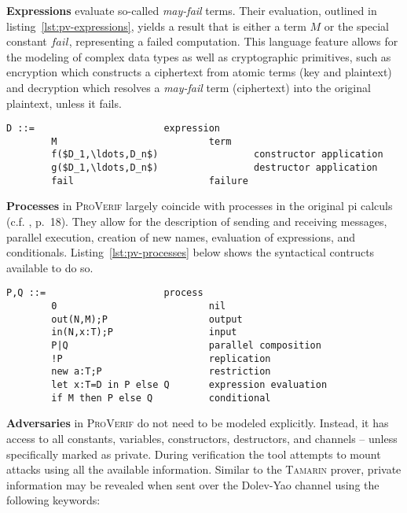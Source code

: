 \textbf{Expressions} evaluate so-called \textit{may-fail} terms.
Their evaluation, outlined in listing~\ref{lst:pv-expressions}, yields a result that is either a term $M$ or the special constant $fail$, representing a failed computation.
This language feature allows for the modeling of complex data types as well as cryptographic primitives, such as encryption which constructs a ciphertext from atomic terms (key and plaintext) and decryption which resolves a \textit{may-fail} term (ciphertext) into the original plaintext, unless it fails.

\begin{lstlisting}[caption={ProVerif expression grammar, according to \cite{blanchet2016modeling}, p.~13},label={lst:pv-expressions}]
    D ::=                       expression
        M                           term
        f($D_1,\ldots,D_n$)                 constructor application
        g($D_1,\ldots,D_n$)                 destructor application
        fail                        failure
\end{lstlisting}

\textbf{Processes} in \textsc{ProVerif} largely coincide with processes in the original pi calculs (c.f. \cite{blanchet2016modeling}, p.~18).
They allow for the description of sending and receiving messages, parallel execution, creation of new names, evaluation of expressions, and conditionals.
Listing~\ref{lst:pv-processes} below shows the syntactical contructs available to do so.

\begin{lstlisting}[caption={ProVerif process grammar, according to \cite{blanchet2016modeling}, p.~13},label={lst:pv-processes}]
    P,Q ::=                     process
        0                           nil
        out(N,M);P                  output
        in(N,x:T);P                 input
        P|Q                         parallel composition
        !P                          replication
        new a:T;P                   restriction
        let x:T=D in P else Q       expression evaluation
        if M then P else Q          conditional
\end{lstlisting}

\textbf{Adversaries} in \textsc{ProVerif} do not need to be modeled explicitly.
Instead, it has access to all constants, variables, constructors, destructors, and channels -- unless specifically marked as private.
During verification the tool attempts to mount attacks using all the available information.
Similar to the \textsc{Tamarin} prover, private information may be revealed when sent over the Dolev-Yao channel using the following keywords:

